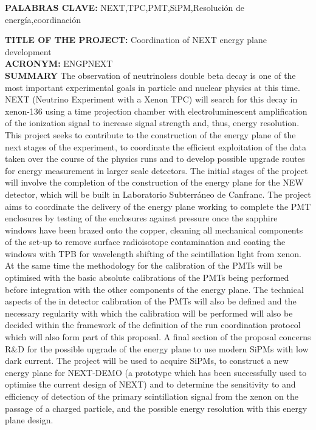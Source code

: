 \documentclass[a4paper,11pt,oneside]{article}
\begin{document}
\noindent\textbf{PALABRAS CLAVE:} NEXT,TPC,PMT,SiPM,Resoluci\'on de
energ\'ia,coordinaci\'on\\
\vspace{12pt}

\noindent\textbf{TITLE OF THE PROJECT:} Coordination of NEXT energy plane development\\
\textbf{ACRONYM:} ENGPNEXT\\
\textbf{SUMMARY} {\color{blue}{Maximum 3500 characters (including
    spaces):}}
The observation of neutrinoless double beta decay is one of the most
important experimental goals in particle and nuclear physics at this
time. NEXT (Neutrino Experiment with a Xenon TPC) will search for this
decay in xenon-136 using a time projection chamber with
electroluminescent amplification of the ionization signal to increase
signal strength and, thus, energy resolution. This project seeks to
contribute to the construction of the energy plane of the next stages
of the experiment, to coordinate the efficient exploitation of the data taken over the course of the physics runs and to develop possible upgrade routes for energy measurement in larger scale detectors.
The initial stages of the project will involve the completion of the
construction of the energy plane for the NEW detector, which will be
built in Laboratorio Subterr\'aneo de Canfranc. The project aims to
coordinate the delivery of the energy plane working to complete the
PMT enclosures by testing of the enclosures against pressure once the
sapphire windows have been brazed onto the copper, cleaning all
mechanical components of the set-up to remove surface radioisotope
contamination and coating the windows with TPB for wavelength shifting
of the scintillation light from xenon. At the same time the
methodology for the calibration of the PMTs will be optimised with the
basic absolute calibrations of the PMTs being performed before
integration with the other components of the energy plane. The
technical aspects of the in detector calibration of the PMTs will also
be defined and the necessary regularity with which the calibration
will be performed will also be decided within the framework of the
definition of the run coordination protocol which will also form part
of this proposal. A final section of the proposal concerns R\&D for
the possible upgrade of the energy plane to use modern SiPMs with low
dark current. The project will be used to acquire SiPMs, to construct
a new energy plane for NEXT-DEMO (a prototype which has been
successfully used to optimise the current design of NEXT) and to
determine the sensitivity to and efficiency of detection of the
primary scintillation signal from the xenon on the passage of a
charged particle, and the possible energy resolution with this energy
plane design.
\vspace{12pt}
\end{document}
